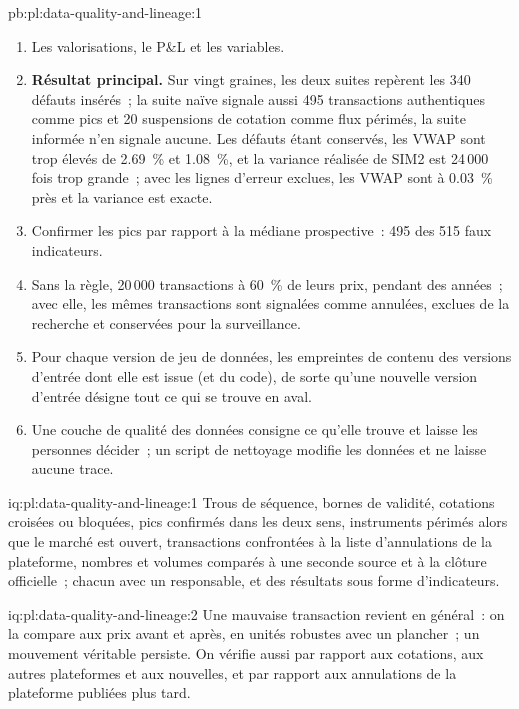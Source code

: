 \begin{solution}{pb:pl:data-quality-and-lineage:1}
\begin{enumerate}
motif, ou qu'elle soit reconstruite.
\item Les valorisations, le P\&L et les variables.
\item \textbf{Résultat principal.} Sur vingt graines, les deux suites repèrent les 340 défauts insérés~; la suite naïve signale aussi 495 transactions authentiques
comme pics et 20 suspensions de cotation comme flux périmés, la suite informée n'en signale aucune. Les défauts étant conservés, les VWAP sont trop élevés de 2.69~\% et 1.08~\%, et la variance réalisée de SIM2
est 24\,000 fois trop grande~; avec les lignes d'erreur exclues, les VWAP sont à 0.03~\% près et la variance est exacte.
\item Confirmer les pics par rapport à la médiane prospective~: 495 des 515 faux indicateurs.
\item Sans la règle, 20\,000 transactions à 60~\% de leurs prix, pendant des années~; avec elle, les mêmes transactions sont signalées comme annulées, exclues de la
recherche et conservées pour la surveillance.
\item Pour chaque version de jeu de données, les empreintes de contenu des versions d'entrée dont elle est issue (et du code), de sorte qu'une nouvelle
version d'entrée désigne tout ce qui se trouve en aval.
\item Une couche de qualité des données consigne ce qu'elle trouve et laisse les personnes décider~; un script de nettoyage modifie les données et ne laisse aucune trace.
\end{enumerate}
\end{solution}

\begin{solution}{iq:pl:data-quality-and-lineage:1}
Trous de séquence, bornes de validité, cotations croisées ou bloquées, pics confirmés dans les deux sens, instruments périmés alors que le marché est ouvert,
transactions confrontées à la liste d'annulations de la plateforme, nombres et volumes comparés à une seconde source et à la clôture officielle~; chacun avec un
responsable, et des résultats sous forme d'indicateurs.
\end{solution}

\begin{solution}{iq:pl:data-quality-and-lineage:2}
Une mauvaise transaction revient en général~: on la compare aux prix avant et après, en unités robustes avec un plancher~; un mouvement véritable persiste.
On vérifie aussi par rapport aux cotations, aux autres plateformes et aux nouvelles, et par rapport aux annulations de la plateforme publiées plus tard.
\end{solution}

